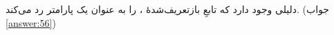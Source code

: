 \section{}
\paragraph{}\label{hint:353}
دلیلی وجود دارد که تابعِ بازتعریف‌شدهٔ ،  را به عنوان یک پارامتر رد می‌کند. (جواب \ref{answer:56})